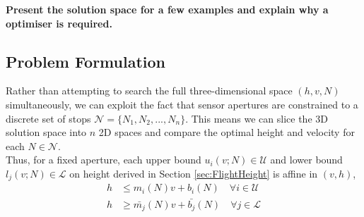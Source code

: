 \documentclass[11pt]{article}
\begin{document}
\textbf{Present the solution space for a few examples and explain why a optimiser is required.}\\






\subsection{Problem Formulation}

Rather than attempting to search the full three-dimensional space \((h,v,N)\) simultaneously, we can exploit the fact that sensor apertures are constrained to a discrete set of stops $\mathcal{N} = \{N_1,N_2,...,N_n\}$. This means we can slice the 3D solution space into $n$ 2D spaces and compare the optimal height and velocity for each $N \in \mathcal{N}$. \\

Thus, for a fixed aperture, each upper bound $u_i(v;N) \in \mathcal{U}$ and lower bound $l_j(v;N) \in \mathcal{L}$ on height derived in Section \ref{sec:FlightHeight} is affine in $(v,h)$, 
\begin{align}
  h &\leq m_i(N)v + b_i(N) \quad \forall i \in \mathcal{U}\\
  h &\geq \bar{m_j}(N)v + \bar{b_j}(N) \quad \forall j \in \mathcal{L}
\end{align}
\end{document}

